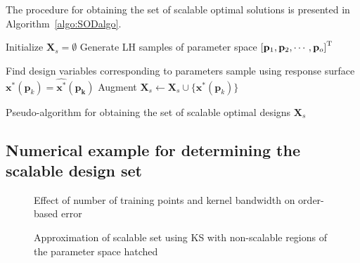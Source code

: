 The procedure for obtaining the set of scalable optimal solutions is presented in Algorithm~\ref{algo:SODalgo}.

\begin{algorithm}
	\DontPrintSemicolon %
	{\color{red}Initialize $\mathbf{X}_s = \emptyset$}\;
	Generate \ac{LH} samples of parameter space $\left[\mathbf{p}_{1},\mathbf{p}_{2}, \cdots, \mathbf{p}_{o}\right]^{\text T}$\;
	 {

		 {
			Find design variables corresponding to parameters sample using response surface $\mathbf{x}^*(\mathbf{p}_k) = \hat{\mathbf{x}^*}(\mathbf{p_k})$\;
			Augment $\mathbf{X}_s \gets \mathbf{X}_s \cup \{ \mathbf{x}^*(\mathbf{p}_k) \} $\;
		}
	}
	\caption{Pseudo-algorithm for obtaining the set of scalable optimal designs $\mathbf{X}_s$}
	\label{algo:SODalgo}
\end{algorithm}

\subsection{Numerical example for determining the scalable design set} \label{subsec:numex}

\begin{figure*}[h!]
	\centering
	 \hspace{0.07\textwidth}%
	\caption{Effect of number of training points and kernel bandwidth on order-based error}
	\label{fig:HPeffect}
\end{figure*}

\begin{figure*}[h!]
	\centering
	 \hspace{0.07\textwidth}%
	\caption{Approximation of scalable set using \ac{KS} with non-scalable regions of the parameter space hatched}
	\label{fig:testfun}
\end{figure*}

